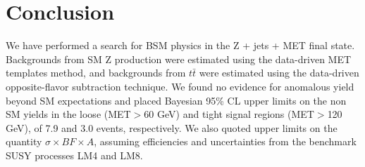 \section{Conclusion}
\label{sec:conclusion}

We have performed a search for BSM physics in the Z + jets + MET final state.
Backgrounds from SM Z production were estimated using the data-driven
MET templates method, and backgrounds from $t\bar{t}$ were estimated using
the data-driven opposite-flavor subtraction technique. We found no evidence
for anomalous yield beyond SM expectations and placed Bayesian 95\% CL upper limits
on the non SM yields in the loose (MET$>$60 GeV) and tight signal regions (MET$>$120 GeV),
of 7.9 and 3.0 events, respectively. We also quoted upper limits on the quantity
$\sigma \times BF \times A$, assuming efficiencies and uncertainties from the benchmark
SUSY processes LM4 and LM8.
